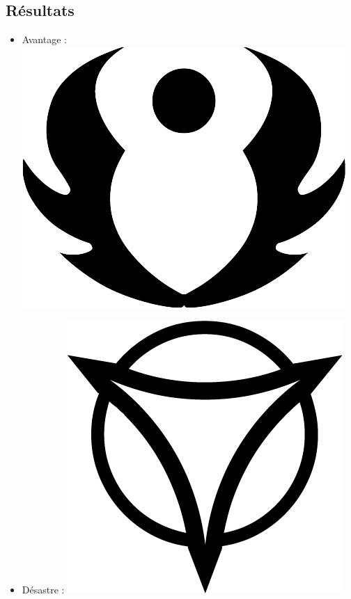 \documentclass{article}
\begin{document}
\begin{multicols}{3}
	\section*{Résultats}
	\begin{itemize}
		\item Avantage : {\Large \includegraphics[height=\fontcharht\font`\B]{../img/result_avantage_advantage}}
		\item Désastre : {\Large \includegraphics[height=\fontcharht\font`\B]{../img/result_desastre_despair}}

\end{itemize}
\end{multicols}
\end{document}
